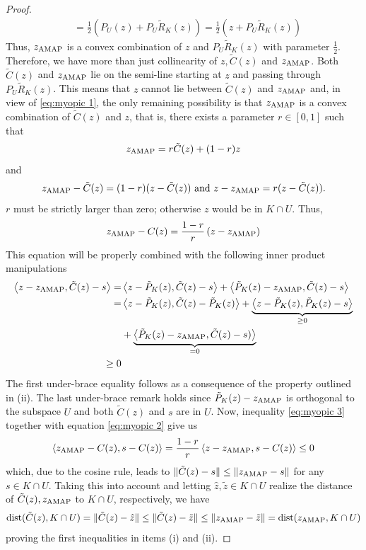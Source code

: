 \documentclass[smallextended,numbook,nospthms]{svjour3}
\theoremstyle{plain}
\theoremstyle{definition}
\DeclareMathOperator{\dist}{dist}
\newcommand{\scal}[2]{\left\langle{#1},{#2}  \right\rangle}
\newcommand{\AMAP}{{\rm AMAP}}
\begin{document}
\begin{proof}
\begin{align}
		&=\frac{1}{2}\left(P_{U}(z)+P_{U} \tilde{R}_{K}(z)\right)=\frac{1}{2}\left(z+P_{U} \tilde{R}_{K}(z)\right)
	\end{align}
	Thus, $z_{\AMAP}$ is a convex combination of $z$ and $P_{U}\tilde{R}_{K}(z)$ with parameter $\frac{1}{2}$. Therefore, we have more than just collinearity of $z, \tilde{C}(z)$ and $z_{\AMAP}$. Both $\tilde{C}(z)$ and $z_{\AMAP}$ lie on the semi-line starting at $z$ and passing through $P_{U}\tilde{R}_{K}(z)$. This means that $z$ cannot lie between $\tilde{C}(z)$ and $z_{\AMAP}$ and, in view of \cref{eq:myopic 1}, the only remaining possibility is that $z_{\AMAP}$ is a convex combination of $\tilde{C}(z)$ and $z$, that is, there exists a parameter $r \in[0,1]$ such that
	\begin{equation}
		z_{\AMAP}=r\tilde{C}(z)+(1-r)z
	\end{equation}
	and
	\begin{equation}
		z_{\AMAP}-\tilde{C}(z)=(1-r)(z-\tilde{C}(z)) \text { and } z-z_{\AMAP}=r(z-\tilde{C}(z)).
	\end{equation}
	$r$ must be strictly larger than zero;  otherwise $z$ would be in $K \cap U$. Thus,
	\begin{equation}\label{eq:myopic 2}
		z_{\AMAP}-C(z)=\frac{1-r}{r}\left(z-z_{\AMAP}\right)
	\end{equation}
	This equation will be properly combined with the following inner product manipulations
	\begin{align}
		\scal{z-z_{\AMAP}}{\tilde{C}(z)-s}=&\scal{z-\tilde{P}_{K}(z)}{\tilde{C}(z)-s}+\scal{\tilde{P}_{K}(z)-z_{\AMAP}}{\tilde{C}(z)-s} \notag \\
		=&\scal{z-\tilde{P}_{K}(z)}{\tilde{C}(z)-\tilde{P}_{K}(z)}+\underbrace{\scal{z-\tilde{P}_{K}(z)}{\tilde{P}_{K}(z)-s}}_{\geq 0} \notag \\
		&+\underbrace{\scal{\tilde{P}_{K}(z)-z_{\AMAP}}{\tilde{C}(z)-s)}}_{=0}  \\
		\geq 0\label{eq:myopic 3}
	\end{align}
	The first under-brace equality follows as a consequence of the property outlined in (ii). The last under-brace remark holds since $\tilde{P}_{K}(z)-z_{\AMAP}$ is orthogonal to the subspace $U$ and both $\tilde{C}(z)$ and $s$ are in $U $. Now, inequality \cref{eq:myopic 3} together with equation \cref{eq:myopic 2} give us
	\begin{equation}
		\scal{z_{\AMAP}-C(z)}{s-C(z)}=\frac{1-r}{r}\scal{z-z_{\AMAP}}{s-C(z)} \leq 0
	\end{equation}
	which, due to the cosine rule, leads to $\|\tilde{C}(z)-s\| \leq\|z_{\AMAP}-s\|$ for any $s \in K \cap U$. Taking this into account and letting $\hat{z}, \tilde{z} \in K \cap U$ realize the distance of $\tilde{C}(z), z_{\AMAP}$ to $K \cap U$, respectively, we have
	\begin{equation}
		\dist(\tilde{C}(z), K \cap U)=\|\tilde{C}(z)-\hat{z}\| \leq\|\tilde{C}(z)-\tilde{z}\| \leq\|z_{\AMAP}-\tilde{z}\|=\dist(z _{\AMAP}, K \cap U)	
	\end{equation}
	proving the first inequalities in items (i) and (ii).
\end{proof}
\end{document}
